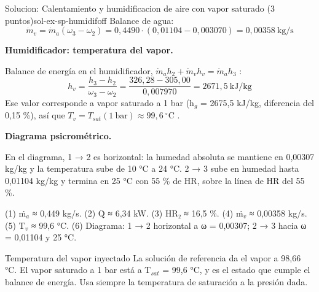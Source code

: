 \documentclass[11pt,a4paper]{article}
\begin{document}
\begin{ocg}{Solucion: Calentamiento y humidificacion de aire con vapor saturado (3 puntos)}{sol-ex-sp-humidif}{off}
Balance de agua:  \[\dot m_v = \dot m_a(\omega_3 - \omega_2) = 0{,}4490\cdot(0{,}01104 - 0{,}003070) = 0{,}00358\ \text{kg/s}\]

\par\medskip\noindent\textbf{Humidificador: temperatura del vapor.}\par
Balance de energía en el humidificador,  $\dot m_a h_2 + \dot m_v h_v = \dot m_a h_3$ :  \[h_v = \frac{h_3 - h_2}{\omega_3 - \omega_2} = \frac{326{,}28 - 305{,}00}{0{,}007970} = 2671{,}5\ \text{kJ/kg}\]  Ese valor corresponde a vapor saturado a 1 bar (h$_{g}$ = 2675,5 kJ/kg, diferencia del 0,15 \%), así que  $T_v = T_{sat}(1\ \text{bar}) \approx 99{,}6\ ^{\circ}\text{C}$ .

\par\medskip\noindent\textbf{Diagrama psicrométrico.}\par
En el diagrama, 1 → 2 es horizontal: la humedad absoluta se mantiene en 0,00307 kg/kg y la temperatura sube de 10 °C a 24 °C. 2 → 3 sube en humedad hasta 0,01104 kg/kg y termina en 25 °C con 55 \% de HR, sobre la línea de HR del 55 \%.

\begin{resbox}
(1) ṁ$_{a}$ ≈ 0,449 kg/s. (2) Q̇ ≈ 6,34 kW. (3) HR₂ ≈ 16,5 \%. (4) ṁ$_{v}$ ≈ 0,00358 kg/s. (5) T$_{v}$ ≈ 99,6 °C. (6) Diagrama: 1 → 2 horizontal a ω = 0,00307; 2 → 3 hacia ω = 0,01104 y 25 °C.
\end{resbox}

\begin{ojobox}{Temperatura del vapor inyectado}
La solución de referencia da el vapor a 98,66 °C. El vapor saturado a 1 bar está a T$_{sat}$ = 99,6 °C, y es el estado que cumple el balance de energía. Usa siempre la temperatura de saturación a la presión dada.
\end{ojobox}

\hspace{0pt}\end{ocg}
\end{document}
